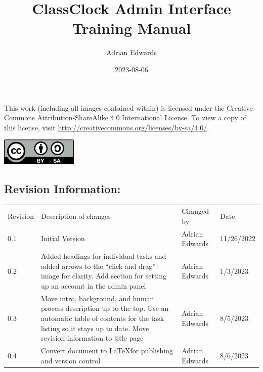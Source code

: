 \documentclass{article}
\title{ClassClock Admin Interface \\Training Manual}
\author{Adrian Edwards}
\date{2023-08-06}
\begin{document}
\makeatletter
\begin{titlepage}
    
	\begin{FlushRight}
		\vspace*{1cm}
			
		\Huge
		\textbf{\@title}
			
		\vspace{0.5cm}
		\LARGE
		\@date
			
		\vspace{1.5cm}
			
		\textbf{\@author}
	\end{FlushRight}
		
	\vfill
	\begin{center}
        
		{This work (including all images contained within) is licensed under the Creative Commons Attribution-ShareAlike 4.0
		International License. To view a copy of this license, visit \href{http://creativecommons.org/licenses/by-sa/4.0/}{http://creativecommons.org/licenses/by-sa/4.0/}.}



		\includegraphics[width=1.439in,height=0.5043in]{Mini20Manual-img001.png}
            
    \end{center}
\end{titlepage}
\makeatother

\clearpage
\large
\subsection*{Revision Information:}

\bigskip
\normalsize
{
	\centering
	\begin{tabularx}{\textwidth}{m{3.5em} X m{7.2em} m{1em}}
	{Revision} &
	{Description of changes} &
	{Changed by} &
	{Date}\\

	{0.1} &
	{Initial Version} &
	{Adrian Edwards} &
	{11/26/2022}\\

	{0.2} &
	{Added headings for individual tasks and added arrows to the “click and drag” image for
	clarity. Add section for setting up an account in the admin panel} &
	{Adrian Edwards} &
	{1/3/2023}\\

	{0.3} &
	{Move intro, background, and human process description up to the top. Use an automatic table of
	contents for the task listing so it stays up to date. Move revision information to title page} &
	{Adrian Edwards} &
	{8/5/2023}\\

	{0.4} &
	{Convert document to \LaTeX for publishing and version control} &
	{Adrian Edwards} &
	{8/6/2023}\\
\end{tabularx}\par
}
\end{document}
